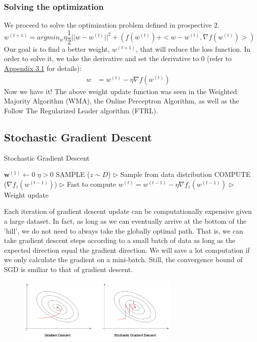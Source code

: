 \documentclass[11pt]{article}
\begin{document}
\subsubsection*{Solving the optimization}
We proceed to solve the optimization problem defined in prospective 2. 
\[w^{(t+1)} = arg min_w \eta \frac{1}{2} ||w - w^{(t)}||^2 + (f(w^{(t)}) + <w - w^{(t)}, \nabla f(w^{(t)})>)\]
Our goal is to find a better weight, \(w^{(t+1)}\), that will reduce the loss function. In order to solve it, we take the derivative and set the derivative to 0 (refer to \hyperref[sec:App Solving the optimization]{Appendix 3.1} for details):
\begin{align*}
    w &= w^{(t)} - \eta \nabla f(w^{(t)})
\end{align*}
Now we have it! The above weight update function was seen in the Weighted Majority Algorithm (WMA), the Online Perceptron Algorithm, as well as the Follow The Regularized Leader algorithm (FTRL).




\subsection{Stochastic Gradient Descent}
\normalfont
\begin{algorithm}[H]
\caption{Stochastic Gradient Descent}
\begin{algorithmic}[1]
\STATE $\textbf{w}^{(1)} \leftarrow {0}$ \hfill
\STATE $\eta > 0$ \hfill
{} 
\STATE \textsc{SAMPLE} ($z \sim D $) \hfill $\triangleright$ Sample from data distribution
\STATE \textsc{COMPUTE} ($\nabla f_z(w^{(t-1)})$) \hfill $\triangleright$ Fast to compute
\STATE $w^{(t)} = w^{(t - 1)} - \eta \nabla f_z(w^{(t - 1)}) $  \hfill $\triangleright$ Weight update
\ENDFOR
\end{algorithmic}
\end{algorithm}
Each iteration of gradient descent update can be computationally expensive given a large dataset. In fact, as long as we can eventually arrive at the bottom of the 'hill', we do not need to always take the globally optimal path. That is, we can take gradient descent steps according to a small batch of data as long as the expected direction equal the gradient direction. We will save a lot computation if we only calculate the gradient on a mini-batch. Still, the convergence bound of SGD is smiliar to that of gradient descent.
\begin{figure}[H]
    \centering
    \includegraphics[width=0.7\textwidth]{pic/GD-v-SGD.png}
\end{figure}
\end{document}
